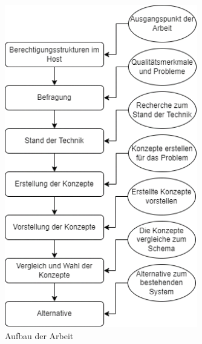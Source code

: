 \begin{figure}[h!]
 \centering
 \includegraphics[width=0.75\textwidth]{gfx/Picture/Vorgehen.PNG}
 \caption{Aufbau der Arbeit}
 \label{fig:vorgehen}
\end{figure}